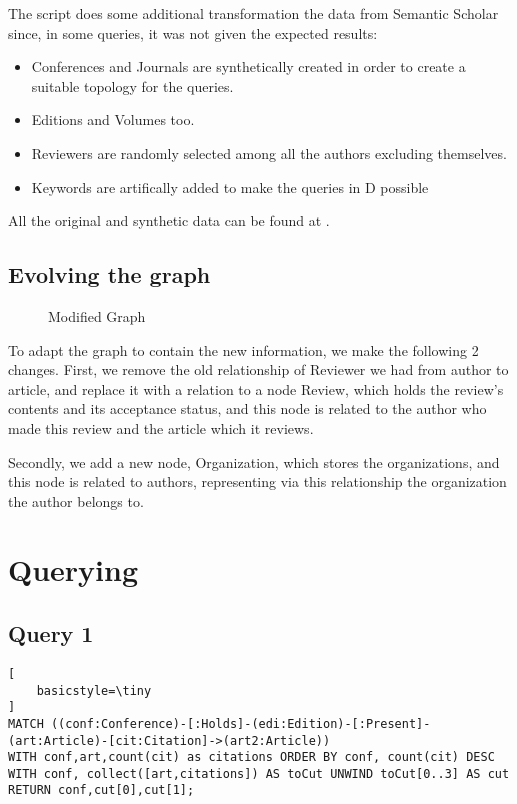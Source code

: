 \documentclass[11pt, a4paper]{article}
\begin{document}
The script  does some additional transformation the data from Semantic Scholar since, in some queries, it was not given the expected results:

\begin{itemize}
  \item Conferences and Journals are synthetically created in order to create a suitable topology for the queries.
  \item Editions and Volumes too.
  \item Reviewers are randomly selected among all the authors excluding themselves.
  \item Keywords are artifically added to make the queries in D possible
\end{itemize}

All the original and synthetic data can be found at .
\subsection{Evolving the graph}%
\label{sub:evolving_the_graph}

\begin{figure}[H]
  \center
  \caption{Modified Graph}
  \label{fig:modifiedGraph}
\end{figure}


To adapt the graph to contain the new information, we make the following 2 changes. First, we remove the old relationship of Reviewer we had from author to article, and replace it with a relation to a node Review, which holds the review's contents and its acceptance status, and this node is related to the author who made this review and the article which it reviews.

Secondly, we add a new node, Organization, which stores the organizations, and this node is related to authors, representing via this relationship the organization the author belongs to.

\section{Querying}%
\label{sec:querying}

\subsection{Query 1}
\begin{lstlisting}[
    basicstyle=\tiny
]
MATCH ((conf:Conference)-[:Holds]-(edi:Edition)-[:Present]-(art:Article)-[cit:Citation]->(art2:Article))
WITH conf,art,count(cit) as citations ORDER BY conf, count(cit) DESC
WITH conf, collect([art,citations]) AS toCut UNWIND toCut[0..3] AS cut RETURN conf,cut[0],cut[1];
  \end{lstlisting}
\end{document}
